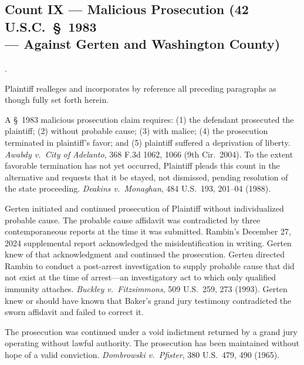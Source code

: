 \documentclass[12pt,letterpaper]{article}
\newcounter{complaintpara}
\newenvironment{paras}{%
	\begin{list}{\arabic{complaintpara}.}{%
			\setlength{\leftmargin}{0.5in}%
			\setlength{\labelwidth}{0.4in}%
			\setlength{\labelsep}{0.1in}%
			\setlength{\itemsep}{0pt}%
			\setlength{\parsep}{0pt}%
			\setlength{\topsep}{6pt}%
		}%
	}{%
	\end{list}%
}
\newcommand{\sect}{§}
\begin{document}
	\subsection*{Count IX --- Malicious Prosecution (42 U.S.C.\ \S\ 1983\\
		--- Against Gerten and Washington County)}
	\begin{paras}
		
		\item Plaintiff realleges and incorporates by reference all
		preceding paragraphs as though fully set forth herein.
		
		\item A \sect\ 1983 malicious prosecution claim requires:
		(1) the defendant prosecuted the plaintiff; (2) without
		probable cause; (3) with malice; (4) the prosecution
		terminated in plaintiff's favor; and (5) plaintiff suffered
		a deprivation of liberty. \textit{Awabdy v.\ City of
			Adelanto}, 368 F.3d 1062, 1066 (9th Cir.\ 2004). To the
		extent favorable termination has not yet occurred, Plaintiff
		pleads this count in the alternative and requests that it be
		stayed, not dismissed, pending resolution of the state
		proceeding. \textit{Deakins v.\ Monaghan}, 484 U.S.\ 193,
		201--04 (1988).
		
		\item Gerten initiated and continued prosecution of Plaintiff
		without individualized probable cause. The probable cause
		affidavit was contradicted by three contemporaneous reports
		at the time it was submitted. Rambin's December 27, 2024
		supplemental report acknowledged the misidentification in
		writing. Gerten knew of that acknowledgment and continued
		the prosecution. Gerten directed Rambin to conduct a
		post-arrest investigation to supply probable cause that did
		not exist at the time of arrest---an investigatory act to
		which only qualified immunity attaches.
		\textit{Buckley v.\ Fitzsimmons}, 509 U.S.\ 259, 273 (1993).
		Gerten knew or should have known that Baker's grand jury
		testimony contradicted the sworn affidavit and failed to
		correct it.
		
		\item The prosecution was continued under a void indictment
		returned by a grand jury operating without lawful authority.
		The prosecution has been maintained without hope of a valid
		conviction. \textit{Dombrowski v.\ Pfister}, 380 U.S.\ 479,
		490 (1965).
		

\end{paras}
\end{document}
